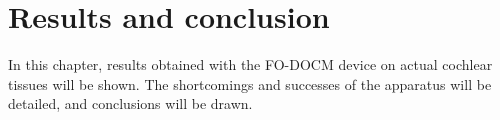 \chapter{Results and conclusion}

In this chapter, results obtained with the FO-DOCM device on actual cochlear tissues will be shown. The shortcomings and successes of the apparatus will be detailed, and conclusions will be drawn.


